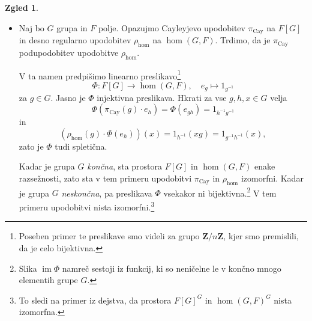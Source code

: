 \documentclass[11pt]{book}
\def\ZZ{\mathbf{Z}}
\def\11{\mathbf{1}}
\DeclareMathOperator\image{im}
\DeclareMathOperator\Cay{Cay}
\theoremstyle{definition}
\theoremstyle{zgled}
\newtheorem*{zgled}{Zgled}
\theoremstyle{odprtproblem}
\theoremstyle{domacanaloga}
\theoremstyle{izrek}
\begin{document}
\begin{zgled}
\begin{itemize}
    Torej za vsak $g \in G$ obstaja $\chi(g) \in F$, da je $\rho(g) \cdot v = \chi(g) v$. Na ta način dobimo funkcijo $\chi \colon G \to F$, se pravi element prostora $\hom(G,F)$. Ta funkcija ni čisto poljubna; ker je $\rho$ upodobitev, je $\chi$ nujno {\em homomorfizem} iz grupe $G$ v grupo $F^*$. Torej je $\chi$ pravzaprav upodobitev grupe $G$ na prostoru $F$ razsežnosti $1$.\footnote{Kadar je $\chi(g) = 1$ za vsak $g \in G$, je ta upodobitev izomorfna $\11$. Kadar je $\chi(g) \neq 1$ za vsaj kak $g \in G$, pa ta upodobitev \emph{ni} trivialna.} 
    
    Zdaj kot v zadnjem zgledu s predpisom
    \[
        \Phi \colon F \to V, \quad
        x \mapsto xv
    \]
    dobimo injektivno spletično med $\chi$ in $\rho$, torej lahko vidimo $\chi$ kot enorazsežno podupodobitev upodobitve $\rho$. Hkrati lahko iz te spletične obnovimo podatek o skupnem lastnem vektorju $v$ in upodobitvi $\chi$.\footnote{Namreč, $v = \Phi(1)$ in $\chi(g) = \rho(g) \cdot 1$.} 
    
    Torej smo vzpostavili bijektivno korespondenco med množico enorazsežnih podupodobitev upodobitve $\rho$ in skupnimi lastnimi vektorji vseh preslikav $\rho(g)$ za $g \in G$.

    Poseben primer te korespondence je zadnji zgled. Množico enorazsežnih trivialnih podupodobitev upodobitve $\rho$ lahko identificiramo z množico neničelnih spletičen $\hom_G(\11, V) \backslash \{ x \mapsto 0 \}$, ta pa ustreza skupnim lastnim vektorjem $\rho(g)$ za $g \in G$ z lastno vrednostjo $1$, kar je ravno množica $V^G \backslash \{ 0 \}$.

    \item Naj bo $G$ grupa in $F$ polje. Opazujmo Cayleyjevo upodobitev $\pi_{\Cay}$ na $F[G]$ in desno regularno upodobitev $\rho_{\hom}$ na $\hom(G,F)$. Trdimo, da je $\pi_{\Cay}$ podupodobitev upodobitve $\rho_{\hom}$.
    
    V ta namen predpišimo linearno preslikavo\footnote{Poseben primer te preslikave smo videli za grupo $\ZZ/n\ZZ$, kjer smo premislili, da je celo bijektivna.}
    \[
        \Phi \colon F[G] \to \hom(G,F), \quad
        e_g \mapsto 1_{g^{-1}}
    \]
    za $g \in G$. Jasno je $\Phi$ injektivna preslikava. Hkrati za vse $g,h,x \in G$ velja
    \[
        \Phi(\pi_{\Cay}(g) \cdot e_h) 
        = \Phi(e_{gh})
        = 1_{h^{-1} g^{-1}}
    \]
    in
    \[
        \left( \rho_{\hom}(g) \cdot \Phi(e_h) \right)(x)
        = 1_{h^{-1}}(xg)
        = 1_{g^{-1} h^{-1}}(x),
    \]
    zato je $\Phi$ tudi spletična.

    Kadar je grupa $G$ \emph{končna}, sta prostora $F[G]$ in $\hom(G,F)$ enake razsežnosti, zato sta v tem primeru upodobitvi $\pi_{\Cay}$ in $\rho_{\hom}$ izomorfni. Kadar je grupa $G$ \emph{neskončna}, pa preslikava $\Phi$ vsekakor ni bijektivna.\footnote{Slika $\image \Phi$ namreč sestoji iz funkcij, ki so neničelne le v končno mnogo elementih grupe $G$.} V tem primeru upodobitvi nista izomorfni.\footnote{To sledi na primer iz dejstva, da prostora $F[G]^G$ in $\hom(G,F)^G$ nista izomorfna.}
\end{itemize}
\end{zgled}
\end{document}
